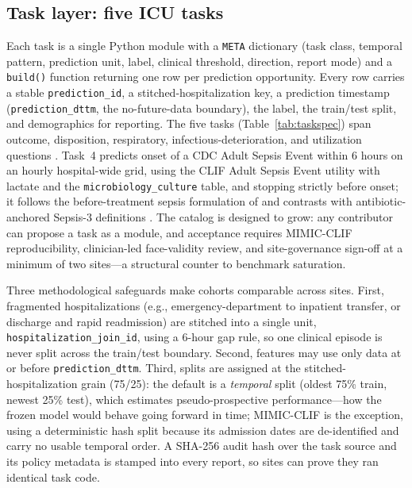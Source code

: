 \documentclass[12pt]{article}
\begin{document}
\subsection*{Task layer: five ICU tasks}

Each task is a single Python module with a \texttt{META} dictionary (task class, temporal pattern, prediction unit, label, clinical threshold, direction, report mode) and a \texttt{build()} function returning one row per prediction opportunity. Every row carries a stable \texttt{prediction\_id}, a stitched-hospitalization key, a prediction timestamp (\texttt{prediction\_dttm}, the no-future-data boundary), the label, the train/test split, and demographics for reporting. The five tasks (Table~\ref{tab:taskspec}) span outcome, disposition, respiratory, infectious-deterioration, and utilization questions \citep{thille2011extubation,rojas2018readmission}. Task~4 predicts onset of a CDC Adult Sepsis Event \citep{rhee2019sepsis} within 6 hours on an hourly hospital-wide grid, using the CLIF Adult Sepsis Event utility with lactate and the \texttt{microbiology\_culture} table, and stopping strictly before onset; it follows the before-treatment sepsis formulation of \citet{kamran2024sepsis} and contrasts with antibiotic-anchored Sepsis-3 definitions \citep{singer2016sepsis3,seymour2016assessment}. The catalog is designed to grow: any contributor can propose a task as a module, and acceptance requires MIMIC-CLIF reproducibility, clinician-led face-validity review, and site-governance sign-off at a minimum of two sites---a structural counter to benchmark saturation.

Three methodological safeguards make cohorts comparable across sites. First, fragmented hospitalizations (e.g., emergency-department to inpatient transfer, or discharge and rapid readmission) are stitched into a single unit, \texttt{hospitalization\_join\_id}, using a 6-hour gap rule, so one clinical episode is never split across the train/test boundary. Second, features may use only data at or before \texttt{prediction\_dttm}. Third, splits are assigned at the stitched-hospitalization grain (75/25): the default is a \emph{temporal} split (oldest 75\% train, newest 25\% test), which estimates pseudo-prospective performance---how the frozen model would behave going forward in time; MIMIC-CLIF is the exception, using a deterministic hash split because its admission dates are de-identified and carry no usable temporal order. A SHA-256 audit hash over the task source and its policy metadata is stamped into every report, so sites can prove they ran identical task code.
\end{document}
